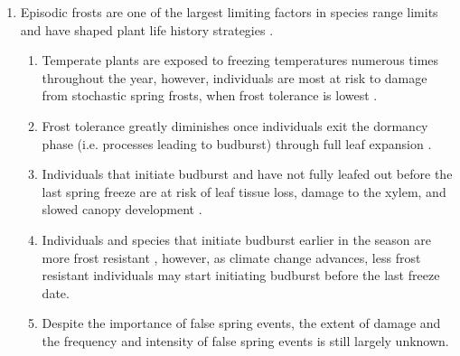 \documentclass{article}\usepackage[]{graphicx}\usepackage[]{color}
\begin{document}
\begin{enumerate}
\item Episodic frosts are one of the largest limiting factors in species range limits and have shaped plant life history strategies \citep{Kollas2014}. 
\begin{enumerate}
\item Temperate plants are exposed to freezing temperatures numerous times throughout the year, however, individuals are most at risk to damage from stochastic spring frosts, when frost tolerance is lowest \citep{Sakai1987}. 
\item Frost tolerance greatly diminishes once individuals exit the dormancy phase (i.e. processes leading to budburst) through full leaf expansion \citep{Vitasse2014, Lenz2016}. %
\item Individuals that initiate budburst and have not fully leafed out before the last spring freeze are at risk of leaf tissue loss, damage to the xylem, and slowed canopy development \citep{Gu2008, Hufkens2012}.
\item Individuals and species that initiate budburst earlier in the season are more frost resistant \citep{Korner2016}, however, as climate change advances, less frost resistant individuals may start initiating budburst before the last freeze date.
\item Despite the importance of false spring events, the extent of damage and the frequency and intensity of false spring events is still largely unknown.
\end{enumerate}


\end{enumerate}
\end{document}
